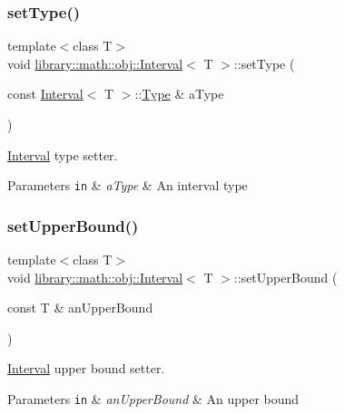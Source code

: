 \subsubsection{\texorpdfstring{set\+Type()}{setType()}}
{\footnotesize\ttfamily template$<$class T$>$ \\
void \hyperlink{classlibrary_1_1math_1_1obj_1_1_interval}{library\+::math\+::obj\+::\+Interval}$<$ T $>$\+::set\+Type (\begin{DoxyParamCaption}\item[{const \hyperlink{classlibrary_1_1math_1_1obj_1_1_interval}{Interval}$<$ T $>$\+::\hyperlink{classlibrary_1_1math_1_1obj_1_1_interval_base_aabce6fa07a6e2e8fd3fcab5fd0d317d6}{Type} \&}]{a\+Type }\end{DoxyParamCaption})}



\hyperlink{classlibrary_1_1math_1_1obj_1_1_interval}{Interval} type setter. 


\begin{DoxyParams}[1]{Parameters}
\mbox{\tt in}  & {\em a\+Type} & An interval type \\
\hline
\end{DoxyParams}
\mbox{\label{classlibrary_1_1math_1_1obj_1_1_interval_a9c6b857d9fad97969635f669428c2b48}} 
\subsubsection{\texorpdfstring{set\+Upper\+Bound()}{setUpperBound()}}
{\footnotesize\ttfamily template$<$class T$>$ \\
void \hyperlink{classlibrary_1_1math_1_1obj_1_1_interval}{library\+::math\+::obj\+::\+Interval}$<$ T $>$\+::set\+Upper\+Bound (\begin{DoxyParamCaption}\item[{const T \&}]{an\+Upper\+Bound }\end{DoxyParamCaption})}



\hyperlink{classlibrary_1_1math_1_1obj_1_1_interval}{Interval} upper bound setter. 


\begin{DoxyParams}[1]{Parameters}
\mbox{\tt in}  & {\em an\+Upper\+Bound} & An upper bound \\
\hline
\end{DoxyParams}
\mbox{\label{classlibrary_1_1math_1_1obj_1_1_interval_a64a1850152db9b95c9824c71378d9f40}} 
